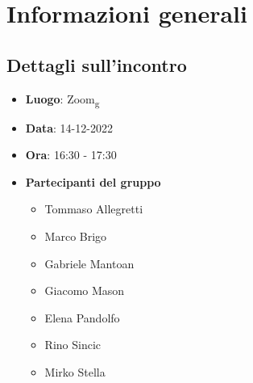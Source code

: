 \section{Informazioni generali}

\subsection{Dettagli sull'incontro}
\begin{itemize}
    \item \textbf{Luogo}: Zoom\textsubscript{g}
    \item \textbf{Data}: 14-12-2022
    \item \textbf{Ora}: 16:30 - 17:30
    \item \textbf{Partecipanti del gruppo}
        \begin{itemize}
            \item Tommaso Allegretti
            \item Marco Brigo
            \item Gabriele Mantoan
            \item Giacomo Mason
            \item Elena Pandolfo
            \item Rino Sincic
            \item Mirko Stella
        \end{itemize}
\end{itemize}

